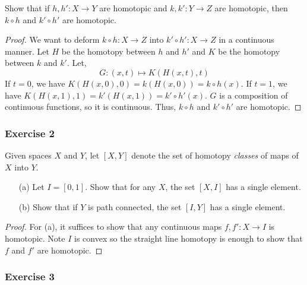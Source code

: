 \documentclass{article}
\begin{document}
Show that if $h,h':X\to Y$ are homotopic and $k,k':Y\to Z$ are homotopic, then $k\circ h$ and $k'\circ h'$ are homotopic.
\begin{proof}
	We want to deform $k\circ h: X\to Z$ into $k' \circ h':X \to Z$ in a continuous manner. Let $H$ be the homotopy between $h$ and $h'$ and $K$ be the homotopy between $k$ and $k'$.
	Let,
	\[ G: (x,t) \mapsto K(H(x,t),t) \]
	If $t=0$, we have $K(H(x,0),0) = k(H(x,0)) = k\circ h (x)$. If $t=1$, we have $K(H(x,1),1) = k'(H(x,1)) = k' \circ h' (x)$. $G$ is a composition of continuous functions, so it is continuous.
	Thus, $k\circ h$ and $k'\circ h'$ are homotopic.
\end{proof}

\subsubsection*{Exercise 2}

Given spaces $X$ and $Y$, let $[X, Y]$ denote the set of homotopy \textit{classes} of maps of $X$ into $Y$.
\begin{enumerate}
	\item[(a)] Let $I = [0,1]$. Show that for any $X$, the set $[X, I]$ has a single element.
	\item[(b)] Show that if $Y$ is path connected, the set $[I, Y]$ has a single element.
\end{enumerate}
\begin{proof}
	For (a), it suffices to show that any continuous maps $f,f': X\to I$ is homotopic. Note $I$ is convex so the straight line homotopy is enough to show that $f$ and $f'$ are homotopic.
\end{proof}

\subsubsection*{Exercise 3}
\end{document}
